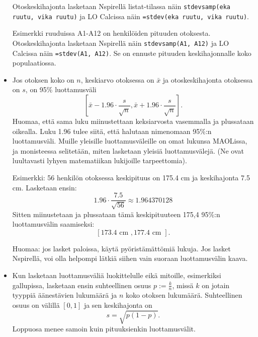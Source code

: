 \documentclass[12pt,leqno,a4paper,oneside]{amsart}
\theoremstyle{definition}
\theoremstyle{remark}
\numberwithin{equation}{section}
\begin{document}
\begin{itemize}
 Otoskeskihajonta lasketaan Nspirellä listat-tilassa näin \texttt{stdevsamp(eka ruutu, vika ruutu)} ja LO Calcissa näin
 \texttt{=stdev(eka ruutu, vika ruutu)}.
 
 Esimerkki ruuduissa A1-A12 on henkilöiden pituuden otoksesta. Otoskeskihajonta lasketaan Nspirellä näin
 \texttt{stdevsamp(A1, A12)} ja LO Calcissa näin
 \texttt{=stdev(A1, A12)}. Se on ennuste pituuden keskihajonnalle koko populaatiossa.
 
 \item
 Jos otoksen koko on $n$, keskiarvo otoksessa on $\bar{x}$ ja otoskeskihajonta otoksessa on $s$, on 95\% luottamusväli
 $$\left[\bar{x}-1.96\cdot\frac{s}{\sqrt{n}},\bar{x}+1.96\cdot\frac{s}{\sqrt{n}} \right] .$$
 Huomaa, että sama luku miinustettaan keksiarvosta vasemmalla ja plussataan oikealla. Luku 1.96 tulee siitä, että halutaan nimenomaan 95\%:n
 luottamusväli. Muille yleisille luottamusväleille on omat lukunsa MAOLissa, ja monisteessa selitetään, miten lasketaan yleisiä luottamusvälejä.
 (Ne ovat luultavasti lyhyen matematiikan lukijoille tarpeettomia).
 
 Esimerkki: 56 henkilön otoksessa keskipituus on 175.4 cm ja keskihajonta 7.5 cm. Lasketaan ensin:
 $$1.96\cdot\frac{7.5}{\sqrt{56}} \approx 1.964370128$$
 Sitten miinustetaan ja plussataan tämä keskipituuteen 175,4 95\%:n luottamusvälin saamiseksi:
 $$[173.4 \text{ cm }, 177.4 \text{ cm }].$$
 
 Huomaa: jos lasket paloissa, käytä pyöristämättömiä lukuja. Jos lasket Nspirellä, voi olla helpompi lätkiä siihen vain suoraan luottamusvälin kaava.
 
 \item
 Kun lasketaan luottamusväliä luokittelulle eikä mitoille, esimerkiksi gallupissa, lasketaan ensin suhteellinen osuus 
 $p:=\frac{k}{n}$, missä $k$ on jotain tyyppiä äänestävien lukumäärä ja $n$ koko otoksen lukumäärä. Suhteellinen osuus on välillä $[0,1]$ ja sen
 keskihajonta on
 $$s=\sqrt{p(1-p)}.$$
 Loppuosa menee samoin kuin pituuksienkin luottamusvälit.
 

\end{itemize}
\end{document}
